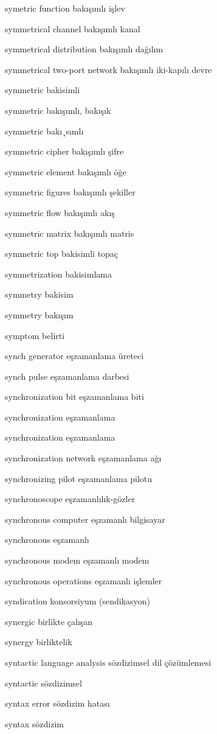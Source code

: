 \documentclass[12pt,fleqn]{article}\usepackage{../../common}
\begin{document}
symetric function bakışımlı işlev

symmetrical channel bakışımlı kanal

symmetrical distribution bakışımlı dağılım

symmetrical two-port network bakışımlı iki-kapılı devre

symmetric bakisimli

symmetric bakışımlı, bakışık

symmetric bakı¸sımlı

symmetric cipher bakışımlı şifre

symmetric element bakışımlı öğe

symmetric figures bakışımlı şekiller

symmetric flow bakışımlı akış

symmetric matrix bakışımlı matris

symmetric top bakisimli topaç

symmetrization bakisimlama

symmetry bakisim

symmetry bakışım

symptom belirti

synch generator eşzamanlama üreteci

synch pulse eşzamanlama darbesi

synchronization bit eşzamanlama biti

synchronization eşzamanlama

synchronization eşzamanlama

synchronization network eşzamanlama ağı

synchronizing pilot eşzamanlama pilotu

synchronoscope eşzamanlılık-gözler

synchronous computer eşzamanlı bilgisayar

synchronous eşzamanlı

synchronous modem eşzamanlı modem

synchronous operations eşzamanlı işlemler

syndication konsorsiyum (sendikasyon)

synergic birlikte çalışan

synergy birliktelik

syntactic language analysis sözdizimsel dil çözümlemesi

syntactic sözdizimsel

syntax error sözdizim hatası

syntax sözdizim
\end{document}
